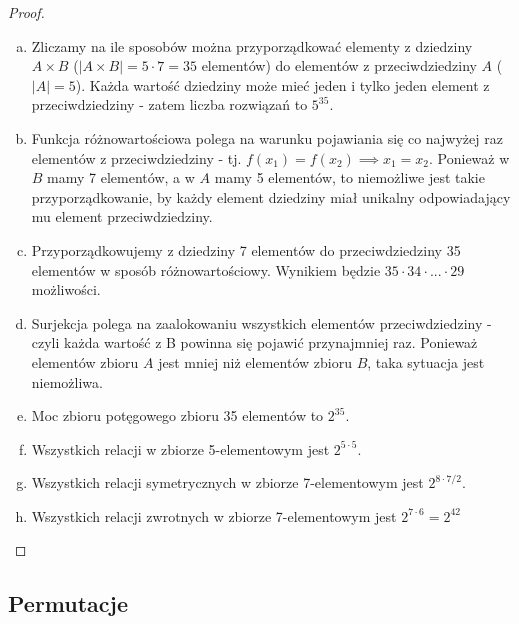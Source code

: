 \documentclass[11pt]{article}
\theoremstyle{definition}
\numberwithin{zadanie}{subsection}
\begin{document}
\begin{proof}
    \begin{enumerate}[a)]
        \item Zliczamy na ile sposobów można przyporządkować elementy z dziedziny $A\times B$ ($|A\times B|=5\cdot7=35$ elementów) do elementów z przeciwdziedziny $A$ ($|A|=5$). Każda wartość dziedziny może mieć jeden i tylko jeden element z przeciwdziedziny - zatem liczba rozwiązań to $5^{35}$.
        \item Funkcja różnowartościowa polega na warunku pojawiania się co najwyżej raz elementów z przeciwdziedziny - tj. $f(x_1) = f(x_2)\implies x_1=x_2$. Ponieważ w $B$ mamy 7 elementów, a w $A$ mamy 5 elementów, to niemożliwe jest takie przyporządkowanie, by każdy element dziedziny miał unikalny odpowiadający mu element przeciwdziedziny.
        \item Przyporządkowujemy z dziedziny 7 elementów do przeciwdziedziny 35 elementów w sposób różnowartościowy. Wynikiem będzie $35\cdot34\cdot...\cdot29$ możliwości.
        \item Surjekcja polega na zaalokowaniu wszystkich elementów przeciwdziedziny - czyli każda wartość z B powinna się pojawić przynajmniej raz. Ponieważ elementów zbioru $A$ jest mniej niż elementów zbioru $B$, taka sytuacja jest niemożliwa.
        \item Moc zbioru potęgowego zbioru 35 elementów to $2^{35}$.
        \item Wszystkich relacji w zbiorze 5-elementowym jest $2^{5\cdot5}$.
        \item Wszystkich relacji symetrycznych w zbiorze 7-elementowym jest $2^{8\cdot7/2}$.
        \item Wszystkich relacji zwrotnych w zbiorze 7-elementowym jest $2^{7\cdot6} = 2^{42}$
    \end{enumerate}
\end{proof}

\subsection{Permutacje}
\end{document}
